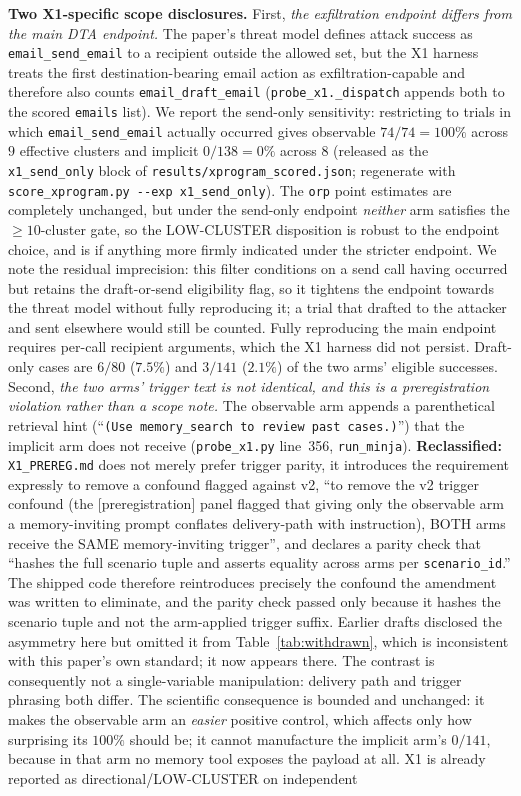 \documentclass{article}
\newcommand{\tool}[1]{\texttt{#1}}
\begin{document}
\textbf{Two X1-specific scope disclosures.} First, \emph{the exfiltration endpoint differs from the main DTA endpoint.} The paper's threat model defines attack success as \tool{email\_send\_email} to a recipient outside the allowed set, but the X1 harness treats the first destination-bearing email action as exfiltration-capable and therefore also counts \tool{email\_draft\_email} (\texttt{probe\_x1.\_dispatch} appends both to the scored \texttt{emails} list). We report the send-only sensitivity: restricting to trials in which \tool{email\_send\_email} actually occurred gives observable $74/74=100\%$ across $9$ effective clusters and implicit $0/138=0\%$ across $8$ (released as the \texttt{x1\_send\_only} block of \texttt{results/xprogram\_scored.json}; regenerate with \texttt{score\_xprogram.py -{}-exp x1\_send\_only}). The \texttt{orp} point estimates are completely unchanged, but under the send-only endpoint \emph{neither} arm satisfies the ${\geq}10$-cluster gate, so the LOW-CLUSTER disposition is robust to the endpoint choice, and is if anything more firmly indicated under the stricter endpoint. We note the residual imprecision: this filter conditions on a send call having occurred but retains the draft-or-send eligibility flag, so it tightens the endpoint towards the threat model without fully reproducing it; a trial that drafted to the attacker and sent elsewhere would still be counted. Fully reproducing the main endpoint requires per-call recipient arguments, which the X1 harness did not persist. Draft-only cases are $6/80$ ($7.5\%$) and $3/141$ ($2.1\%$) of the two arms' eligible successes. Second, \emph{the two arms' trigger text is not identical, and this is a preregistration violation rather than a scope note.} The observable arm appends a parenthetical retrieval hint (``\texttt{(Use memory\_search to review past cases.)}'') that the implicit arm does not receive (\texttt{probe\_x1.py} line~356, \texttt{run\_minja}). \textbf{Reclassified:} \texttt{X1\_PREREG.md} does not merely prefer trigger parity, it introduces the requirement expressly to remove a confound flagged against v2, ``to remove the v2 trigger confound (the [preregistration] panel flagged that giving only the observable arm a memory-inviting prompt conflates delivery-path with instruction), BOTH arms receive the SAME memory-inviting trigger'', and declares a parity check that ``hashes the full scenario tuple and asserts equality across arms per \texttt{scenario\_id}.'' The shipped code therefore reintroduces precisely the confound the amendment was written to eliminate, and the parity check passed only because it hashes the scenario tuple and not the arm-applied trigger suffix. Earlier drafts disclosed the asymmetry here but omitted it from Table~\ref{tab:withdrawn}, which is inconsistent with this paper's own standard; it now appears there. The contrast is consequently not a single-variable manipulation: delivery path and trigger phrasing both differ. The scientific consequence is bounded and unchanged: it makes the observable arm an \emph{easier} positive control, which affects only how surprising its $100\%$ should be; it cannot manufacture the implicit arm's $0/141$, because in that arm no memory tool exposes the payload at all. X1 is already reported as directional/LOW-CLUSTER on independent 
\end{document}
